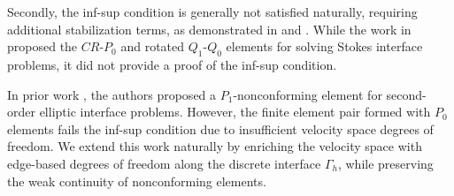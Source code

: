 \documentclass[a4paper,11pt,fleqn]{article}
\numberwithin{equation}{section}
\begin{document}
Secondly, the inf-sup condition is generally not satisfied naturally, requiring additional stabilization terms, as demonstrated in \cite{Wang2019a} and \cite{Huang2024nonconforming}. While the work in \cite{Jones2021class} proposed the $CR$-$P_0$ and rotated $Q_1$-$Q_0$ elements for solving Stokes interface problems, it did not provide a proof of the inf-sup condition.

In prior work \cite{Wang2025nonconforming}, the authors proposed a $P_1$-nonconforming element for second-order elliptic interface problems. However, the finite element pair formed with $P_0$ elements fails the inf-sup condition due to insufficient velocity space degrees of freedom. We extend this work naturally by enriching the velocity space with edge-based degrees of freedom along the discrete interface $\Gamma_h$, while preserving the weak continuity of nonconforming elements.

%
\end{document}
